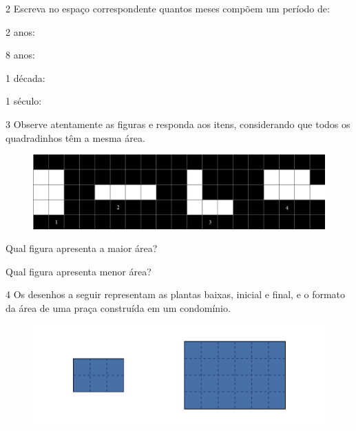 \num{2} Escreva no espaço correspondente quantos meses compõem um período de:

\begin{escolha}
\item
  2 anos:

\item
  8 anos:

\item
  1 década:

\item
  1 século:
\end{escolha}


\num{3} Observe atentamente as figuras e responda aos itens, considerando que todos os quadradinhos têm a mesma área.

\begin{figure}[htpb!]
\centering
\includegraphics[width=\textwidth]{media/image31.png}
\end{figure}

\begin{escolha}
\item Qual figura apresenta a maior área?

\item Qual figura apresenta menor área? 
\end{escolha}


\num{4} Os desenhos a seguir representam as plantas baixas, inicial
e final, e o formato da área de uma praça construída em um condomínio. 

\begin{figure}[htpb!]
\centering
\includegraphics[width=\textwidth]{media/image30.png}
\end{figure}

